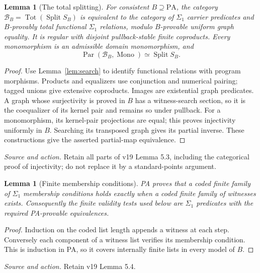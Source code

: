 \documentclass[11pt]{article}
\newtheorem{lemma}[theorem]{Lemma}
\theoremstyle{definition}\newtheorem{definition}[theorem]{Definition}
\newcommand{\PA}{\mathrm{PA}}
\newcommand{\Tot}{\operatorname{Tot}}
\newcommand{\Split}{\operatorname{Split}}
\newcommand{\Par}{\operatorname{Par}}
\newcommand{\B}{\mathcal B}
\newcommand{\source}[1]{\par\smallskip\noindent\textit{Source and action.} #1\par\smallskip}
\begin{document}
\begin{lemma}[The total splitting]\label{lem:total}
For consistent $B\supseteq\PA$, the category
$\B_B=\Tot(\Split S_B)$ is equivalent to the category of
$\Sigma_1$ carrier predicates and $B$-provably total functional
$\Sigma_1$ relations, modulo $B$-provable uniform graph equality.
It is regular with disjoint pullback-stable finite coproducts.
Every monomorphism is an admissible domain monomorphism, and
\[
 \Par(\B_B,\operatorname{Mono})\simeq\Split S_B.
\]
\end{lemma}
\begin{proof}
Use Lemma~\ref{lem:search} to identify functional relations with
program morphisms. Products and equalizers use conjunction and
numerical pairing; tagged unions give extensive coproducts. Images
are existential graph predicates. A graph whose surjectivity is proved
in $B$ has a witness-search section, so it is the coequalizer of its
kernel pair and remains so
under pullback. For a monomorphism, its kernel-pair projections are
equal; this proves injectivity uniformly in $B$. Searching its
transposed graph gives its partial inverse. These constructions give
the asserted partial-map equivalence.
\end{proof}
\source{Retain all parts of v19 Lemma 5.3, including the categorical proof of injectivity; do not replace it by a standard-points argument.}

\begin{lemma}[Finite membership conditions]\label{lem:finite}
PA proves that a coded finite family of $\Sigma_1$ membership
conditions holds exactly when a coded finite family of witnesses
exists. Consequently the finite validity tests used below are
$\Sigma_1$ predicates with the required PA-provable equivalences.
\end{lemma}
\begin{proof}
Induction on the coded list length appends a witness at each step.
Conversely each component of a witness list verifies its membership
condition. This is induction in PA, so it covers internally finite
lists in every model of $B$.
\end{proof}
\source{Retain v19 Lemma 5.4.}
\end{document}
